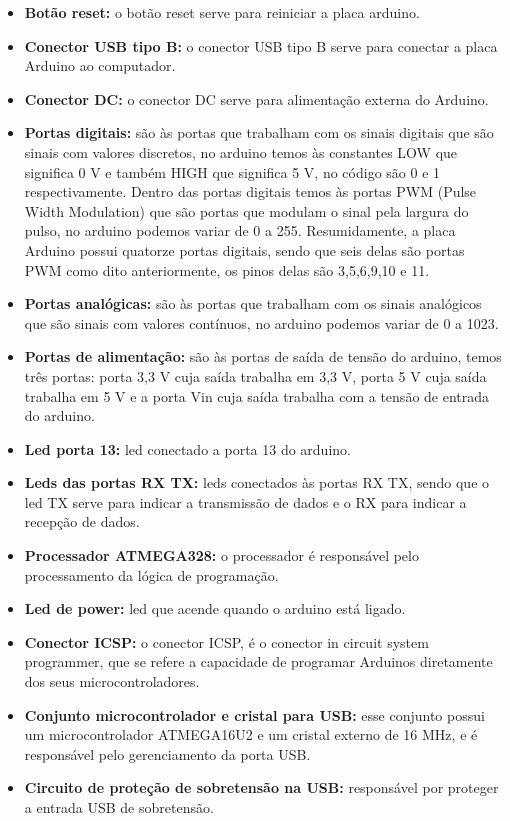 \begin{itemize}
\item \textbf{Botão reset:} o botão reset serve para reiniciar a placa arduino.
\item \textbf{Conector USB tipo B:} o conector USB tipo B serve para conectar a placa Arduino ao computador.
\item \textbf{Conector DC:} o conector DC serve para alimentação externa do Arduino.
\item \textbf{Portas digitais:} são às portas que trabalham com os sinais digitais que são sinais com valores discretos, no arduino temos às constantes LOW que significa 0 V e também HIGH que significa 5 V, no código são 0 e 1 respectivamente. Dentro das portas digitais temos às portas PWM (Pulse Width Modulation) que são portas que modulam o sinal pela largura do pulso, no arduino podemos variar de 0 a 255. Resumidamente, a placa Arduino possui quatorze portas digitais, sendo que seis delas são portas PWM como dito anteriormente, os pinos delas são 3,5,6,9,10 e 11.
\item \textbf{Portas analógicas:} são às portas que trabalham com os sinais analógicos que são sinais com valores contínuos, no arduino podemos variar de 0 a 1023.
\item \textbf{Portas de alimentação:} são às portas de saída de tensão do arduino, temos três portas: porta 3,3 V cuja saída trabalha em 3,3 V, porta 5 V cuja saída trabalha em 5 V e a porta Vin cuja saída trabalha com a tensão de entrada do arduino.
\item \textbf{Led porta 13:} led conectado a porta 13 do arduino.
\item \textbf{Leds das portas RX TX:} leds conectados às portas RX TX, sendo que o led TX serve para indicar a transmissão de dados e o RX para indicar a recepção de dados.
\item \textbf{Processador ATMEGA328:} o processador é responsável pelo processamento da lógica de programação.
\item \textbf{Led de power:} led que acende quando o arduino está ligado.
\item \textbf{Conector ICSP:} o conector ICSP, é o conector in circuit system programmer, que se refere a capacidade de programar Arduinos diretamente dos seus microcontroladores. 
\item \textbf{Conjunto microcontrolador e cristal para USB:} esse conjunto possui um microcontrolador ATMEGA16U2 e um cristal externo de 16 MHz, e é responsável pelo gerenciamento da porta USB.
\item \textbf{Circuito de proteção de sobretensão na USB:} responsável por proteger a entrada USB de sobretensão.

\end{itemize}
